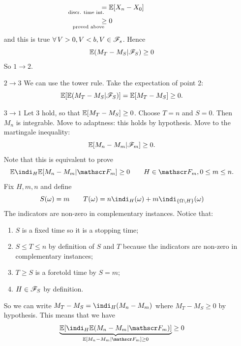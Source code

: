 \documentclass{report}
\begin{document}
\begin{fancyproof}
\begin{enumerate}
\begin{align*}
			&\underset{\mathllap{\text{discr. time int.}}}{=}\ev[X_{n}-X_{0}]\\
			&\underset{\mathllap{\text{proved above}}}{\geq}0
		\end{align*}
		and this is true $\forall\, V>0,V<b,V\in\mathscr{F}_{s}$. Hence
		\begin{equation*}
			\mathbb{E}(M_{T}-M_{S}|\mathscr{F}_{S})\geq 0
		\end{equation*}
		So $1\to2$.
		\item[$2\to3$] We can use the tower rule. Take the expectation of point 2:
		\[\mathbb{E}[\mathbb{E}(M_{T}-M_{S}|\mathscr{F}_{S})]=\mathbb{E}[M_{T}-M_{S}]\geq0.\]
		\item[$3\to1$] Let $3$ hold, so that $\mathbb{E}[M_{T}-M_{S}]\geq0$. Choose $T=n$ and $S=0$. Then
	$M_{n}$ is integrable. Move to adaptness: this holds by hypothesis. Move to the martingale inequality:
	\begin{equation*}
		\mathbb{E}[M_{n}-M_{m}|\mathscr{F}_{m}]\geq0.
	\end{equation*}
	Note that this is equivalent to prove 
	\begin{equation*}
		\ev\indi_H\ev[M_{n}-M_{m}|\F_{m}]\geq0\qquad H\in\F_{m},0\leq m\leq n.
	\end{equation*}
	Fix $H,m,n$ and define
	\begin{equation*}
		S(\omega)=m\qquad T(\omega)=n\indi_H(\omega)+m\indi_{\{\Omega\setminus H\}}(\omega)
	\end{equation*}
	The indicators are non-zero in complementary instances. Notice that:
	\begin{enumerate}
		\item $S$ is a fixed time so it is a stopping time;
		\item $S\leq T\leq n$ by definition of $S$ and $T$ because the indicators are non-zero in complementary instances;
		\item $T\geq S$ is a foretold time by $S=m$;
		\item $H\in\mathscr{F}_{S}$ by definition.
	\end{enumerate}
	So we can write $M_{T}-M_{S}=\indi_H(M_{n}-M_{m})$ where $M_{T}-M_{S}\geq0$ by hypothesis. This means that we have 
	\begin{equation*}
		\underbrace{\ev[\indi_{H}\ev(M_{n}-M_{m}|\F_{m})]}_{\ev[M_{n}-M_{m}|\F_{m}]\geq0}\geq0
	\end{equation*}
	\end{enumerate}
\end{fancyproof}
\end{document}
